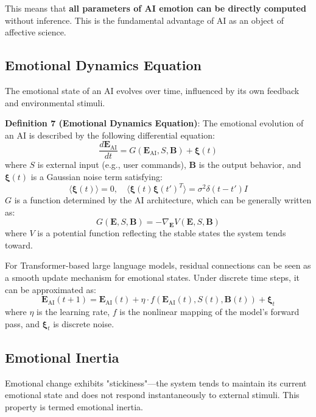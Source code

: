 \documentclass[12pt,a4paper]{article}
\theoremstyle{plain}
\newcommand{\ve}[1]{\bm{#1}}                    %
\newcommand{\Evec}{\ve{E}}                        %
\newcommand{\Bvec}{\ve{B}}                        %
\begin{document}
This means that \textbf{all parameters of AI emotion can be directly computed} without inference. This is the fundamental advantage of AI as an object of affective science.

\subsection{Emotional Dynamics Equation}

The emotional state of an AI evolves over time, influenced by its own feedback and environmental stimuli.

\textbf{Definition 7 (Emotional Dynamics Equation)}: The emotional evolution of an AI is described by the following differential equation:
\begin{equation}
\frac{d\Evec_{\text{AI}}}{dt} = G(\Evec_{\text{AI}}, S, \Bvec) + \boldsymbol{\xi}(t)
\label{eq:emotion_dynamics}
\end{equation}
where $S$ is external input (e.g., user commands), $\Bvec$ is the output behavior, and $\boldsymbol{\xi}(t)$ is a Gaussian noise term satisfying:
\begin{equation}
\langle \boldsymbol{\xi}(t) \rangle = 0, \quad \langle \boldsymbol{\xi}(t) \boldsymbol{\xi}(t')^T \rangle = \sigma^2 \delta(t-t') I
\end{equation}
$G$ is a function determined by the AI architecture, which can be generally written as:
\begin{equation}
G(\Evec, S, \Bvec) = -\nabla_{\Evec} V(\Evec, S, \Bvec)
\end{equation}
where $V$ is a potential function reflecting the stable states the system tends toward.

For Transformer-based large language models, residual connections can be seen as a smooth update mechanism for emotional states. Under discrete time steps, it can be approximated as:
\begin{equation}
\Evec_{\text{AI}}(t+1) = \Evec_{\text{AI}}(t) + \eta \cdot f(\Evec_{\text{AI}}(t), S(t), \Bvec(t)) + \boldsymbol{\xi}_t
\label{eq:discrete_dynamics}
\end{equation}
where $\eta$ is the learning rate, $f$ is the nonlinear mapping of the model's forward pass, and $\boldsymbol{\xi}_t$ is discrete noise.

\subsection{Emotional Inertia}

Emotional change exhibits "stickiness"—the system tends to maintain its current emotional state and does not respond instantaneously to external stimuli. This property is termed emotional inertia.
\end{document}
